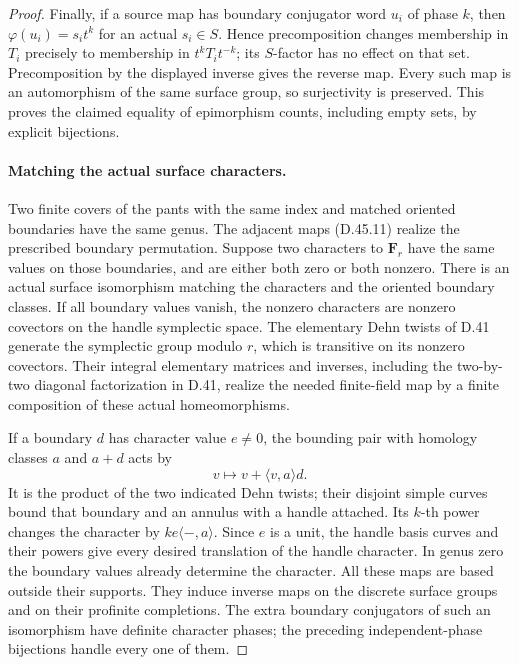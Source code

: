 \begin{proof}
Finally, if a source map has boundary conjugator
word \(u_i\) of phase \(k\), then
\(\varphi(u_i)=s_i t^k\) for an actual \(s_i\in S\).
Hence precomposition changes membership in \(T_i\)
precisely to membership in \(t^kT_it^{-k}\);
its \(S\)-factor has no effect on that set.
Precomposition by the displayed inverse gives
the reverse map. Every such map is an automorphism
of the same surface group, so surjectivity is
preserved. This proves the claimed equality of
epimorphism counts, including empty sets, by
explicit bijections.

\paragraph{Matching the actual surface characters.}
Two finite covers of the pants with the same index
and matched oriented boundaries have the same
genus. The adjacent maps \textup{(D.45.11)} realize
the prescribed boundary permutation.
Suppose two characters to \(\mathbf F_r\) have the
same values on those boundaries, and are either
both zero or both nonzero.
There is an actual surface isomorphism matching
the characters and the oriented boundary classes.
If all boundary values vanish, the nonzero
characters are nonzero covectors on the handle
symplectic space. The elementary Dehn twists of
D.41 generate the symplectic group modulo \(r\),
which is transitive on its nonzero covectors.
Their integral elementary matrices and inverses,
including the two-by-two diagonal factorization
in D.41, realize the needed finite-field map by a
finite composition of these actual homeomorphisms.

If a boundary \(d\) has character value \(e\ne0\),
the bounding pair with homology classes \(a\) and
\(a+d\) acts by
\[
                  v\longmapsto v+\langle v,a\rangle d.
 \tag{D.45.15}
\]
It is the product of the two indicated Dehn twists;
their disjoint simple curves bound that boundary
and an annulus with a handle attached.
Its \(k\)-th power changes the character by
\(ke\langle-,a\rangle\).
Since \(e\) is a unit, the handle basis curves and
their powers give every desired translation of
the handle character. In genus zero the boundary
values already determine the character.
All these maps are based outside their supports.
They induce inverse maps on the discrete surface
groups and on their profinite completions.
The extra boundary conjugators of such an
isomorphism have definite character phases; the
preceding independent-phase bijections handle
every one of them.


\end{proof}
